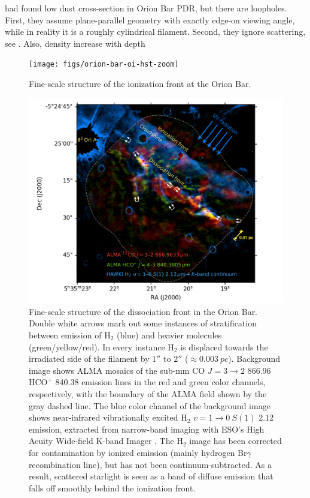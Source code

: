 \documentclass[twocolumn, times]{aastex63}
\newcommand*\chem[1]{\ensuremath{\mathrm{#1}}}
\begin{document}
\citet{Salgado:2016a} had found low dust cross-section in Orion Bar
PDR, but there are loopholes. First, they assume plane-parallel
geometry with exactly edge-on viewing angle, while in reality it is a
roughly cylindrical filament.  Second, they ignore scattering, see
\citet{Watson:1998a}.  Also, density increase with depth

\begin{figure}
  \texttt{[image: figs/orion-bar-oi-hst-zoom]}
  \caption{Fine-scale structure of the ionization front at the Orion Bar.}
  \label{fig:bar-oi-hst}
\end{figure}

\begin{figure}
  \includegraphics[width=\linewidth]{figs/alma-co-hcop-h2-dissoc-front}
  \caption{Fine-scale structure of the dissociation front in the Orion
    Bar.  Double white arrows mark out some instances of
    stratification between emission of \chem{H_2} (blue) and heavier
    molecules (green/yellow/red). In every instance \chem{H_2} is
    displaced towards the irradiated side of the filament by \(1''\)
    to \(2''\) (\(\approx \SI{0.003}{pc}\)).  Background image shows ALMA
    mosaics \citep{Goicoechea:2016a} of the sub-mm \chem{CO}
    \(J = 3 \to 2\) \SI{866.96}{\micron} \chem{HCO^+}
    \SI{840.38}{\micron} emission lines in the red and green color
    channels, respectively, with the boundary of the ALMA field shown
    by the gray dashed line. The blue color channel of the background
    image shows near-infrared vibrationally excited \chem{H_2}
    \(v = 1 \to 0\ S(1)\) \SI{2.12}{\micron} emission, extracted from
    narrow-band imaging with ESO's High Acuity Wide-field K-band
    Imager \citetext{HAWK-I, \citealp{Kissler-Patig:2008a}}. The
    \chem{H_2} image has been corrected for contamination by ionized
    emission (mainly hydrogen Br\(\gamma\) recombination line), but has not
    been continuum-subtracted.  As a result, scattered starlight
    \citetext{cloudshine, \citealp{Foster:2006a}} is seen as a band
    of diffuse emission that falls off smoothly behind the ionization
    front. }
  \label{fig:alma-dissoc-front}
\end{figure}
\end{document}
